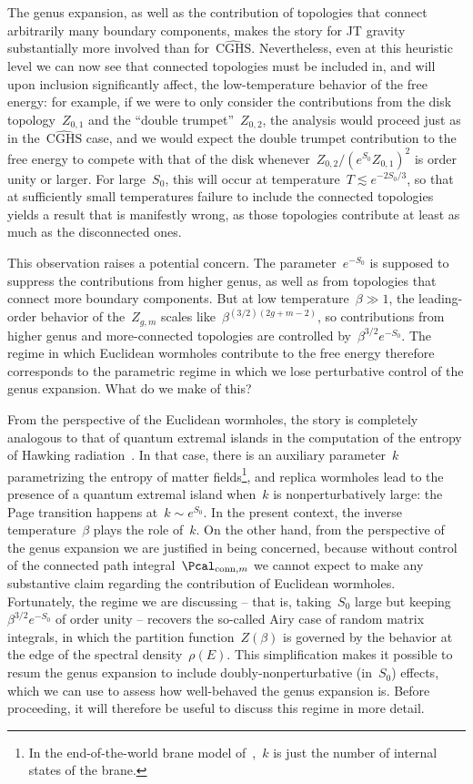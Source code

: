 \documentclass[12pt]{article}
\begin{document}
The genus expansion, as well as the contribution of topologies that connect arbitrarily many boundary components, makes the story for JT gravity substantially more involved than for~$\widehat{\mathrm{CGHS}}$.  Nevertheless, even at this heuristic level we can now see that connected topologies must be included in, and will upon inclusion significantly affect,  the low-temperature behavior of the free energy: for example, if we were to only consider the contributions from the disk topology~$Z_{0,1}$ and the ``double trumpet''~$Z_{0,2}$, the analysis would proceed just as in the~$\widehat{\mathrm{CGHS}}$ case, and we would expect the double trumpet contribution to the free energy to compete with that of the disk whenever~$Z_{0,2}/(e^{S_0} Z_{0,1})^2$ is order unity or larger.  For large~$S_0$, this will occur at temperature~$T \lesssim e^{-2S_0/3}$, so that at sufficiently small temperatures failure to include the connected topologies yields a result that is manifestly wrong, as those topologies contribute at least as much as the disconnected ones.

This observation raises a potential concern.  The parameter~$e^{-S_0}$ is supposed to suppress the contributions from higher genus, as well as from topologies that connect more boundary components.  But at low temperature~$\beta \gg 1$, the leading-order behavior of the~$Z_{g,m}$ scales like~$\beta^{(3/2)(2g+m-2)}$, so contributions from higher genus and more-connected topologies are controlled by~$\beta^{3/2} e^{-S_0}$.  The regime in which Euclidean wormholes contribute to the free energy therefore corresponds to the parametric regime in which we lose perturbative control of the genus expansion.  What do we make of this?

From the perspective of the Euclidean wormholes, the story is completely analogous to that of quantum extremal islands in the computation of the entropy of Hawking radiation~\cite{PenShe19,AlmHar19}.  In that case, there is an auxiliary parameter~$k$ parametrizing the entropy of matter fields\footnote{In the end-of-the-world brane model of~\cite{PenShe19},~$k$ is just the number of internal states of the brane.}, and replica wormholes lead to the presence of a quantum extremal island when~$k$ is nonperturbatively large: the Page transition happens at~$k \sim e^{S_0}$.  In the present context, the inverse temperature~$\beta$ plays the role of~$k$.  On the other hand, from the perspective of the genus expansion we are justified in being concerned, because without control of the connected path integral~$\Pcal_{\mathrm{conn},m}$ we cannot expect to make any substantive claim regarding the contribution of Euclidean wormholes.  Fortunately, the regime we are discussing -- that is, taking~$S_0$ large but keeping~$\beta^{3/2} e^{-S_0}$ of order unity -- recovers the so-called Airy case of random matrix integrals, in which the partition function~$Z(\beta)$ is governed by the behavior at the edge of the spectral density~$\rho(E)$.  This simplification makes it possible to resum the genus expansion to include doubly-nonperturbative (in~$S_0$) effects, which we can use to assess how well-behaved the genus expansion is.  Before proceeding, it will therefore be useful to discuss this regime in more detail.
\end{document}
